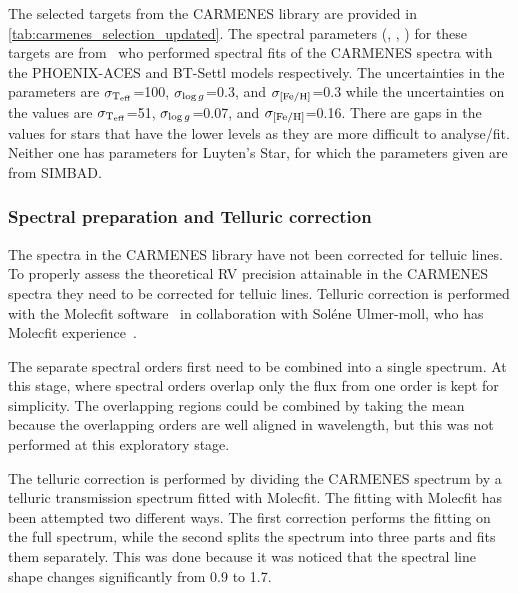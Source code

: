 The selected targets from the {CARMENES} library are provided in \cref{tab:carmenes_selection_updated}.
The spectral parameters (\Teff{}, \Logg{}, \feh{}) for these targets are from~\citet{passegger_carmenes_2018, rajpurohit_exploring_2018} who performed spectral fits of the {CARMENES} spectra with the {PHOENIX-ACES} and {BT-Settl} models respectively.
The uncertainties in the~\citet{rajpurohit_exploring_2018} parameters are \(\sigma_{\textrm{T}_{\mathrm{eff}}{}}\)=100\K{}, \(\sigma_{\log{g}{}}\)=0.3, and \(\sigma_{\feh{}}\)=0.3 while the uncertainties on the 
\citet{passegger_carmenes_2018} values are \(\sigma_{\textrm{T}_{\mathrm{eff}}{}}\)=51\K{}, \(\sigma_{\log{g}{}}\)=0.07, and \(\sigma_{\feh{}}\)=0.16.
There are gaps in the~\citet{passegger_carmenes_2018} values for stars that have the lower \snr{} levels as they are more difficult to analyse/fit.
Neither one has parameters for Luyten's Star, for which the parameters given are from {SIMBAD}.

\begin{landscape}
    
\end{landscape}


\subsubsection{Spectral preparation and Telluric correction}
\label{subsec:prepatation_on_carmenes}
The spectra in the  {CARMENES} library have not been corrected for telluic lines.
To properly assess the theoretical {RV} precision attainable in the {CARMENES} spectra they need to be corrected for telluic lines.
Telluric correction is performed with the {Molecfit} software~\citep{smette_molecfit_2015} in collaboration with Sol\'ene Ulmer-moll, who has {Molecfit} experience~\citep{ulmer-moll_telluric_2018}.

The separate spectral orders first need to be combined into a single spectrum.
At this stage, where spectral orders overlap only the flux from one order is kept for simplicity.
The overlapping regions could be combined by taking the mean because the overlapping orders are well aligned in wavelength, but this was not performed at this exploratory stage.

The telluric correction is performed by dividing the {CARMENES} spectrum by a telluric transmission spectrum fitted with {Molecfit}.
The fitting with {Molecfit} has been attempted two different ways.
The first correction performs the fitting on the full \nir{} spectrum, while the second splits the spectrum into three parts and fits them separately.
This was done because it was noticed that the spectral line shape changes significantly from 0.9\um{} to 1.7\um{}.

